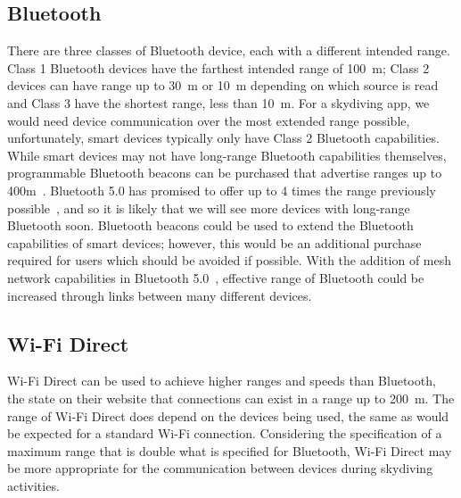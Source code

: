 \documentclass[11pt, a4paper, twocolumn]{article}
\begin{document}
\subsection{Bluetooth}\label{sec:bluetooth} %

There are three classes of Bluetooth device, each with a different intended range. Class 1 Bluetooth devices have the farthest intended range of \SI{100}{\metre}; Class 2 devices can have range up to \SI{30}{\metre} or \SI{10}{\metre} depending on which source is read~\cite{noauthor_bluetooth_nodate, wright_dispelling_nodate} and Class 3 have the shortest range, less than \SI{10}{\metre}.
For a skydiving app, we would need device communication over the most extended range possible, unfortunately, smart devices typically only have Class 2 Bluetooth capabilities. While smart devices may not have long-range Bluetooth capabilities themselves, programmable Bluetooth beacons can be purchased that advertise ranges up to 400m~\cite{noauthor_coin_nodate}. Bluetooth 5.0 has promised to offer up to 4 times the range previously possible~\cite{bluetooth_sig_inc_rethinking_nodate}, and so it is likely that we will see more devices with long-range Bluetooth soon. Bluetooth beacons could be used to extend the Bluetooth capabilities of smart devices; however, this would be an additional purchase required for users which should be avoided if possible. With the addition of mesh network capabilities in Bluetooth 5.0~\cite{noauthor_mesh_nodate}, effective range of Bluetooth could be increased through links between many different devices.

\subsection{Wi-Fi Direct}\label{sec:wifi-direct} %

Wi-Fi Direct can be used to achieve higher ranges and speeds than Bluetooth, the \citeauthor{wi-fi_alliance_wi-fi_nodate} state on their website that connections can exist in a range up to \SI{200}{\metre}. The range of Wi-Fi Direct does depend on the devices being used, the same as would be expected for a standard Wi-Fi connection. Considering the specification of a maximum range that is double what is specified for Bluetooth, Wi-Fi Direct may be more appropriate for the communication between devices during skydiving activities.
\end{document}
